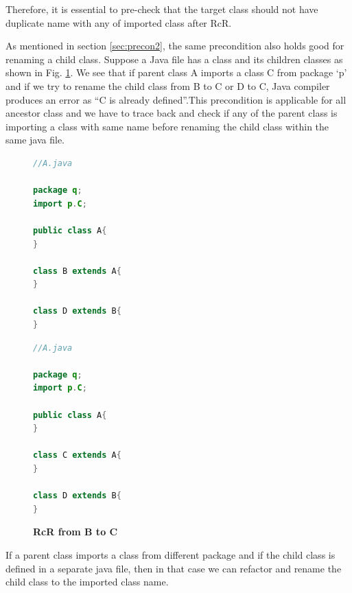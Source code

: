 Therefore, it is essential to pre-check that the target class should not have duplicate name with any of imported class after RcR.


As mentioned in  section \ref{sec:precon2}, the same precondition also holds good for renaming a child class. Suppose a Java file has a class and its children classes as shown in Fig. \ref{figure:figpc3_1}. We see that if parent class A imports a class C from package `p' and if we try to rename the child class from B to C or D to C, Java compiler produces an error as ``C is already defined''.This precondition is applicable for all ancestor class and we have to trace back and check if any of the parent class is importing a class with same name before renaming the child class within the same java file.

\begin{figure}[th]
\centering
\begin{minipage}[t]{0.45\linewidth}
\begin{lstlisting}[language=java, basicstyle=\scriptsize\ttfamily,frame=single]	
//A.java

package q;
import p.C;

public class A{	
}

class B extends A{	
}

class D extends B{
}
\end{lstlisting}
\end{minipage}
\hfill
\begin{minipage}[t]{0.45\linewidth}
\begin{lstlisting}[language=java, basicstyle=\scriptsize\ttfamily,frame=single]
//A.java

package q;
import p.C;

public class A{	
}

class C extends A{	
}

class D extends B{
}	
\end{lstlisting}
\end{minipage}
\caption{\textbf{RcR from B to C}}
\label{figure:figpc3_1}
\end{figure}

If a parent class imports a class from different package and if the child class is defined in a separate java file, then in that case we can refactor and rename the child class to the imported class name.
